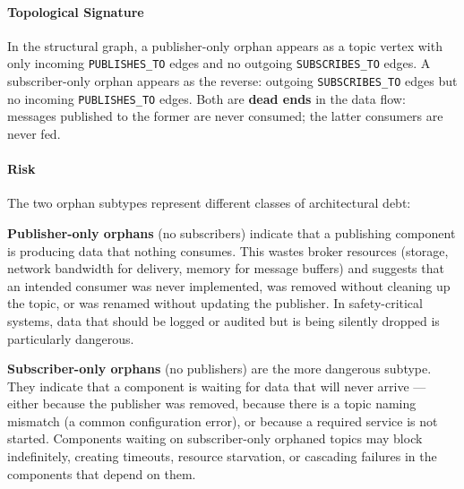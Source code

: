 \documentclass[11pt]{article}
\begin{document}
\paragraph{Topological Signature}
In the structural graph, a publisher-only orphan appears as a topic vertex with only incoming \texttt{PUBLISHES\_TO} edges and no outgoing \texttt{SUBSCRIBES\_TO} edges. A subscriber-only orphan appears as the reverse: outgoing \texttt{SUBSCRIBES\_TO} edges but no incoming \texttt{PUBLISHES\_TO} edges. Both are \textbf{dead ends} in the data flow: messages published to the former are never consumed; the latter consumers are never fed.

\paragraph{Risk}
The two orphan subtypes represent different classes of architectural debt:

\textbf{Publisher-only orphans} (no subscribers) indicate that a publishing component is producing data that nothing consumes. This wastes broker resources (storage, network bandwidth for delivery, memory for message buffers) and suggests that an intended consumer was never implemented, was removed without cleaning up the topic, or was renamed without updating the publisher. In safety-critical systems, data that should be logged or audited but is being silently dropped is particularly dangerous.

\textbf{Subscriber-only orphans} (no publishers) are the more dangerous subtype. They indicate that a component is waiting for data that will never arrive --- either because the publisher was removed, because there is a topic naming mismatch (a common configuration error), or because a required service is not started. Components waiting on subscriber-only orphaned topics may block indefinitely, creating timeouts, resource starvation, or cascading failures in the components that depend on them.
\end{document}
